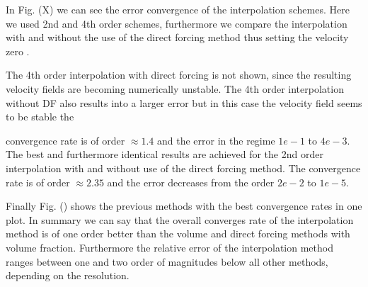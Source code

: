 In Fig. (X) we can see the error convergence of the interpolation schemes.
Here we used 2nd and 4th order schemes, furthermore we compare the interpolation with and without the
use of the direct forcing method thus setting the velocity zero .

The 4th order interpolation with direct forcing is not shown, since the resulting velocity fields are becoming
numerically unstable. The 4th order interpolation without DF also results into a larger error but in this case
the velocity field seems to be stable the

convergence rate is of order $\approx 1.4$ and the error in the regime $1e-1$ to $4e-3$.
The best and furthermore identical results are achieved for the 2nd order interpolation with and without
use of the direct forcing method. The convergence rate is of order $\approx 2.35$ and the error
decreases from the order $2e-2$ to $1e-5$.

Finally Fig. () shows the previous methods with the best convergence rates in one plot.
In summary we can say that the overall converges rate of the interpolation method is of one order better
than the volume and direct forcing methods with volume fraction. Furthermore the relative error of the interpolation method ranges
between one and two order of magnitudes below all other methods, depending on the resolution.


